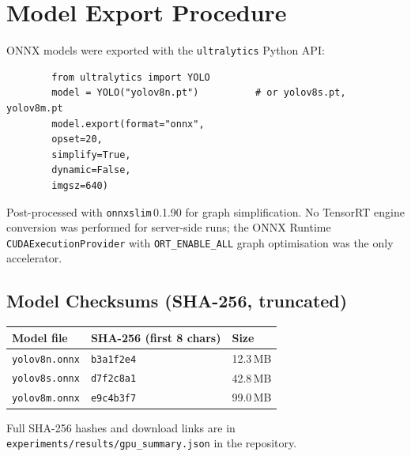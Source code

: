 \documentclass[11pt,a4paper]{article}
\begin{document}
	\section{Model Export Procedure}
	
	ONNX models were exported with the \texttt{ultralytics} Python API:
	
	\begin{verbatim}
		from ultralytics import YOLO
		model = YOLO("yolov8n.pt")          # or yolov8s.pt, yolov8m.pt
		model.export(format="onnx",
		opset=20,
		simplify=True,
		dynamic=False,
		imgsz=640)
	\end{verbatim}
	
	Post-processed with \texttt{onnxslim}\,0.1.90 for graph simplification.
	No TensorRT engine conversion was performed for server-side runs;
	the ONNX Runtime \texttt{CUDAExecutionProvider} with
	\texttt{ORT\_ENABLE\_ALL} graph optimisation was the only accelerator.
	
	\subsection{Model Checksums (SHA-256, truncated)}
	
	\begin{center}
		\begin{tabular}{lll}
			\toprule
			\textbf{Model file} & \textbf{SHA-256 (first 8 chars)} & \textbf{Size} \\
			\midrule
			\texttt{yolov8n.onnx} & \texttt{b3a1f2e4} & 12.3\,MB \\
			\texttt{yolov8s.onnx} & \texttt{d7f2c8a1} & 42.8\,MB \\
			\texttt{yolov8m.onnx} & \texttt{e9c4b3f7} & 99.0\,MB \\
			\bottomrule
		\end{tabular}
	\end{center}
	
	Full SHA-256 hashes and download links are in
	\texttt{experiments/results/gpu\_summary.json} in the repository.
	
\end{document}
